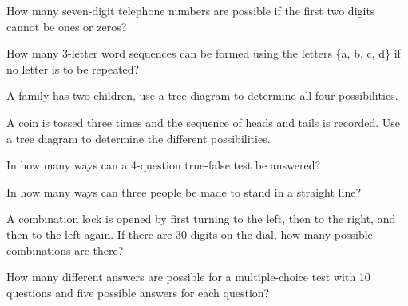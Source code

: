 \begin{puzzle}
    How many seven-digit telephone numbers are possible if the first two digits cannot be ones or zeros?
\end{puzzle}

\begin{puzzle}
    How many 3-letter word sequences can be formed using the letters \{a, b, c, d\} if no letter is to be repeated?
\end{puzzle}

\begin{puzzle}
    A family has two children, use a tree diagram to determine all four possibilities.
\end{puzzle}

\begin{puzzle}
    A coin is tossed three times and the sequence of heads and tails is recorded. Use a tree diagram to determine the different possibilities.
\end{puzzle}

\begin{puzzle}
    In how many ways can a 4-question true-false test be answered?
\end{puzzle}

\begin{puzzle}
    In how many ways can three people be made to stand in a straight line?
\end{puzzle}

\begin{puzzle}
    A combination lock is opened by first turning to the left, then to the right, and then to the left again. If there are 30 digits on the dial, how many possible combinations are there?
\end{puzzle}

\begin{puzzle}
    How many different answers are possible for a multiple-choice test with 10 questions and five possible answers for each question?
\end{puzzle}